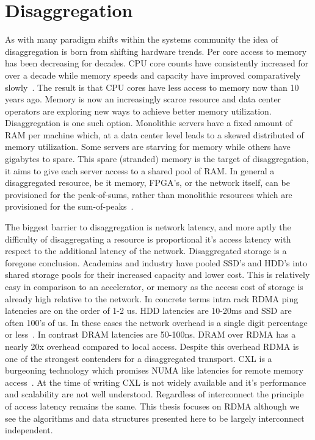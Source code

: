 \documentclass[12pt]{ucsddissertation}
\begin{document}
\section{Disaggregation}

As with many paradigm shifts within the systems community the idea of disaggregation is born from
shifting hardware trends. Per core access to memory has been decreasing for decades. CPU core counts
have consistently increased for over a decade while memory speeds and capacity have improved
comparatively slowly~. The result is that CPU cores have less access to
memory now than 10 years ago. Memory is now an increasingly scarce resource and data center
operators are exploring new ways to achieve better memory utilization. Disaggregation is one such
option. Monolithic servers have a fixed amount of RAM per machine which, at a data center level leads
to a skewed distributed of memory utilization. Some servers are starving for memory while others
have gigabytes to spare. This spare (stranded) memory is the target of disaggregation, it aims to
give each server access to a shared pool of RAM. In general a disaggregated resource, be it memory,
FPGA's, or the network itself, can be provisioned for the peak-of-sums, rather than monolithic
resources which are provisioned for the sum-of-peaks~\cite{clio,supernic,dsnf}.

The biggest barrier to disaggregation is network latency, and more aptly the difficulty of
disaggregating a resource is proportional it's access latency with respect to the additional latency
of the network. Disaggregated storage is a foregone conclusion. Academias and industry have pooled
SSD's and HDD's into shared storage pools for their increased capacity and lower cost. This is
relatively easy in comparison to an accelerator, or memory as the access cost of storage is already
high relative to the network. In concrete terms intra rack RDMA ping latencies are on the order of
1-2 us. HDD latencies are 10-20ms and SSD are often 100's of us. In these cases the network overhead
is a single digit percentage or less~\cite{decible}. In
contrast DRAM latencies are 50-100ns. DRAM over RDMA has a nearly 20x overhead compared to local
access. Despite this overhead RDMA is one of the strongest contenders for a disaggregated transport.
CXL is a burgeoning technology which promises NUMA like latencies for remote memory
access~\cite{cxl}. At the time of writing CXL is not widely available and it's performance and
scalability are not well understood. Regardless of interconnect the principle of access latency
remains the same. This thesis focuses on RDMA although we see the algorithms and data structures
presented here to be largely interconnect independent.
\end{document}
